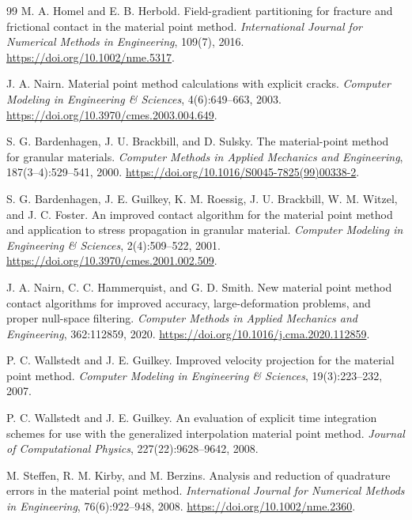 \begin{thebibliography}{99}
M. A. Homel and E. B. Herbold.
\newblock Field-gradient partitioning for fracture and frictional contact in the material point method.
\newblock \emph{International Journal for Numerical Methods in Engineering}, 109(7), 2016.
\newblock \url{https://doi.org/10.1002/nme.5317}.

J. A. Nairn.
\newblock Material point method calculations with explicit cracks.
\newblock \emph{Computer Modeling in Engineering \& Sciences}, 4(6):649--663, 2003.
\newblock \url{https://doi.org/10.3970/cmes.2003.004.649}.

S. G. Bardenhagen, J. U. Brackbill, and D. Sulsky.
\newblock The material-point method for granular materials.
\newblock \emph{Computer Methods in Applied Mechanics and Engineering}, 187(3--4):529--541, 2000.
\newblock \url{https://doi.org/10.1016/S0045-7825(99)00338-2}.

S. G. Bardenhagen, J. E. Guilkey, K. M. Roessig, J. U. Brackbill, W. M. Witzel, and J. C. Foster.
\newblock An improved contact algorithm for the material point method and application to stress propagation in granular material.
\newblock \emph{Computer Modeling in Engineering \& Sciences}, 2(4):509--522, 2001.
\newblock \url{https://doi.org/10.3970/cmes.2001.002.509}.



J. A. Nairn, C. C. Hammerquist, and G. D. Smith.
\newblock New material point method contact algorithms for improved accuracy, large-deformation problems, and proper null-space filtering.
\newblock \emph{Computer Methods in Applied Mechanics and Engineering}, 362:112859, 2020.
\newblock \url{https://doi.org/10.1016/j.cma.2020.112859}.

P. C. Wallstedt and J. E. Guilkey.
\newblock Improved velocity projection for the material point method.
\newblock \emph{Computer Modeling in Engineering \& Sciences}, 19(3):223--232, 2007.

P. C. Wallstedt and J. E. Guilkey.
\newblock An evaluation of explicit time integration schemes for use with the generalized interpolation material point method.
\newblock \emph{Journal of Computational Physics}, 227(22):9628--9642, 2008.

M. Steffen, R. M. Kirby, and M. Berzins.
\newblock Analysis and reduction of quadrature errors in the material point method.
\newblock \emph{International Journal for Numerical Methods in Engineering}, 76(6):922--948, 2008.
\newblock \url{https://doi.org/10.1002/nme.2360}.


\end{thebibliography}
